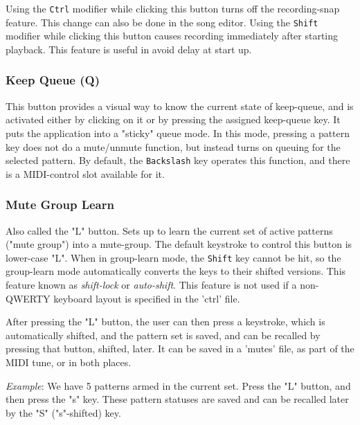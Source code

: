    Using the \texttt{Ctrl} modifier while clicking this button
   turns off the recording-snap feature.
   This change can also be done in the song editor.
   Using the \texttt{Shift} modifier while clicking this button
   causes recording immediately after starting playback.
   This feature is useful in avoid delay at start up.

\subsubsection{Keep Queue (Q)}
\label{subsubsec:introduction_keep_queue_button}

   This button provides a visual way to know the current
   state of keep-queue, and is
   activated either by clicking on it or by pressing the assigned keep-queue
   key.
   It puts the application into a "sticky" queue mode.
   In this mode, pressing a pattern key does not do a mute/unmute function, but
   instead turns on queuing for the selected pattern.
   By default, the \texttt{Backslash} key operates this function,
   and there is a MIDI-control slot available for it.

\subsubsection{Mute Group Learn}
\label{subsubsec:introduction_mute_group_learn_button}

   Also called the "L" button.
   Sets up to learn the current set of active patterns ("mute group") into a
   mute-group.
   The default keystroke to control this button is lower-case "L".
   When in group-learn mode, the \texttt{Shift} key cannot be hit, so the
   group-learn mode automatically converts the keys to their shifted versions.
   This feature known as \textsl{shift-lock} or \textsl{auto-shift}.
   This feature is not used if a non-QWERTY keyboard layout is
   specified in the 'ctrl' file.

   After pressing the "L" button, the user can then press a keystroke, which is
   automatically shifted, and the pattern set is saved, and can be recalled by
   pressing that button, shifted, later.
   It can be saved in a 'mutes' file, as part of
   the MIDI tune, or in both places.

   \textsl{Example}:
   We have 5 patterns armed in the current set. Press the "L" button,
   and then press the "s" key.  These pattern statuses are saved and can be
   recalled later by the "S" ("s"-shifted) key.


